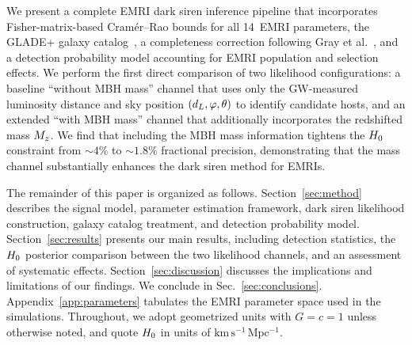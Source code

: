We present a complete EMRI dark siren inference pipeline that
incorporates Fisher-matrix-based Cram\'er--Rao bounds for all
14~EMRI parameters, the GLADE+ galaxy catalog~\cite{Dalya:2021ewn},
a completeness correction following Gray et
al.~\cite{Gray:2019ksv}, and a detection probability model
accounting for EMRI population and selection effects.
We perform the first direct comparison of two likelihood
configurations: a baseline ``without MBH mass'' channel that uses only
the GW-measured luminosity distance and sky position $(d_L, \varphi,
\theta)$ to identify candidate hosts, and an extended ``with MBH
mass'' channel that additionally incorporates the redshifted mass
$M_z$.  We find that including the MBH mass information tightens the
$H_0$ constraint from $\sim\!4\%$ to $\sim\!1.8\%$ fractional
precision, demonstrating that the mass channel substantially enhances
the dark siren method for EMRIs.

The remainder of this paper is organized as follows.
Section~\ref{sec:method} describes the signal model, parameter
estimation framework, dark siren likelihood construction, galaxy
catalog treatment, and detection probability model.
Section~\ref{sec:results} presents our main results, including
detection statistics, the $H_0$ posterior comparison between the two
likelihood channels, and an assessment of systematic effects.
Section~\ref{sec:discussion} discusses the implications and
limitations of our findings.  We conclude in
Sec.~\ref{sec:conclusions}.  Appendix~\ref{app:parameters} tabulates
the EMRI parameter space used in the simulations.
Throughout, we adopt geometrized units with $G = c = 1$ unless
otherwise noted, and quote $H_0$ in units of
$\mathrm{km\,s^{-1}\,Mpc^{-1}}$.
